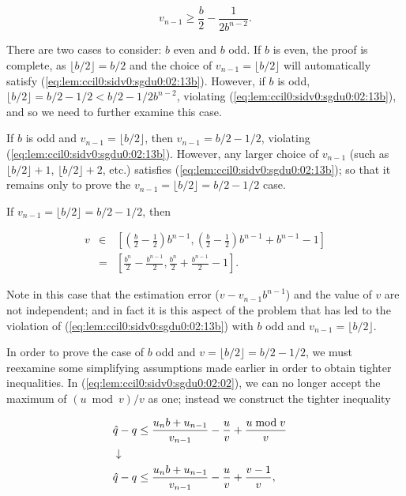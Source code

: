 \begin{vworklemmaproof}
\begin{equation}
\label{eq:lem:ccil0:sidv0:sgdu0:02:13b}
v_{n-1} \geq \frac{b}{2} - \frac{1}{2 b^{n-2}} .
\end{equation}

There are two cases to consider:  $b$ even and $b$ odd.  If $b$ is even, the
proof is complete, as $\lfloor b/2 \rfloor = b/2$ and the choice of 
$v_{n-1} = \lfloor b/2 \rfloor$ will automatically satisfy
(\ref{eq:lem:ccil0:sidv0:sgdu0:02:13b}).  However, if $b$ is odd, 
$\lfloor b/2 \rfloor = b/2 - 1/2 < b/2 - 1/2b^{n-2}$, violating
(\ref{eq:lem:ccil0:sidv0:sgdu0:02:13b}),
and so we need to
further examine this case.

If $b$ is odd and $v_{n-1} = \lfloor b/2 \rfloor$, then 
$v_{n-1} = b/2 - 1/2$, violating (\ref{eq:lem:ccil0:sidv0:sgdu0:02:13b}).
However, any larger choice of $v_{n-1}$ (such as
$\lfloor b/2 \rfloor + 1$, $\lfloor b/2 \rfloor + 2$, etc.) satisfies
(\ref{eq:lem:ccil0:sidv0:sgdu0:02:13b}); so that it remains only to prove
the $v_{n-1} = \lfloor b/2 \rfloor = b/2 - 1/2$
case.

If $v_{n-1} = \lfloor b/2 \rfloor = b/2 - 1/2$, then

\begin{eqnarray}
\label{eq:lem:ccil0:sidv0:sgdu0:02:14}
v & \in & \left[ 
\left( \frac{b}{2} - \frac{1}{2}\right) b^{n-1},
\left( \frac{b}{2} - \frac{1}{2}\right) b^{n-1} + b^{n-1} - 1
\right] \\
\nonumber & = &
\left[
\frac{b^n}{2} - \frac{b^{n-1}}{2},
\frac{b^n}{2} + \frac{b^{n-1}}{2} -1
\right] .
\end{eqnarray}

Note in this case that the estimation error ($v - v_{n-1}b^{n-1}$) and the
value of $v$ are not independent; and in fact it is this aspect
of the problem that has led to the violation of 
(\ref{eq:lem:ccil0:sidv0:sgdu0:02:13b}) with $b$ odd and 
$v_{n-1} = \lfloor b/2 \rfloor$.

In order to prove the case of $b$ odd and $v = \lfloor b/2 \rfloor = b/2 - 1/2$, 
we must reexamine some simplifying assumptions made earlier in order to obtain
tighter inequalities.  In (\ref{eq:lem:ccil0:sidv0:sgdu0:02:02}), we can no
longer accept the maximum of $(u \bmod v)/v$ as one; instead we construct the 
tighter inequality

\begin{eqnarray}
\label{eq:lem:ccil0:sidv0:sgdu0:02:15}
& \displaystyle \hat{q} - q \leq  \frac{u_n b + u_{n-1}}{v_{n-1}}
                - \frac{u}{v}
                + \frac{u \bmod v}{v} & \\
\nonumber &  \downarrow & \\
\label{eq:lem:ccil0:sidv0:sgdu0:02:16}
& \displaystyle \hat{q} - q \leq  \frac{u_n b + u_{n-1}}{v_{n-1}}
                - \frac{u}{v}
                + \frac{v-1}{v} , &
\end{eqnarray}


\end{vworklemmaproof}
